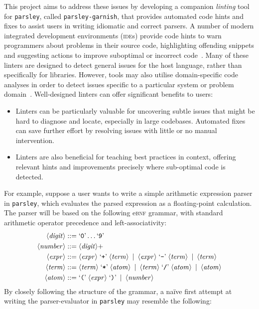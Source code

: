 \documentclass[../../main.tex]{subfiles}
\begin{document}
This project aims to address these issues by developing a companion \emph{linting} tool for \texttt{parsley}, called \texttt{parsley-garnish}, that provides automated code hints and fixes to assist users in writing idiomatic and correct parsers.
A number of modern integrated development environments (\textsc{ide}s) provide code hints to warn programmers about problems in their source code, highlighting offending snippets and suggesting actions to improve suboptimal or incorrect code~\cite{kurbatova_intellij_2021}.
Many of these linters are designed to detect general issues for the host language, rather than specifically for libraries.
However, tools may also utilise domain-specific code analyses in order to detect issues specific to a particular system or problem domain~\cite{renggli_domain-specific_2010,gregor_stllint_2006}.
Well-designed linters can offer significant benefits to users:
\begin{itemize}
  \item Linters can be particularly valuable for uncovering subtle issues that might be hard to diagnose and locate, especially in large codebases. Automated fixes can save further effort by resolving issues with little or no manual intervention.
  \item Linters are also beneficial for teaching best practices in context, offering relevant hints and improvements precisely where sub-optimal code is detected.
\end{itemize}
%
For example, suppose a user wants to write a simple arithmetic expression parser in \texttt{parsley}, which evaluates the parsed expression as a floating-point calculation.
The parser will be based on the following e\textsc{bnf} grammar, with standard arithmetic operator precedence and left-associativity:
\begin{align*}
\langle \mathit{digit} \rangle &::= \text{`\texttt{0}'} \ldots \text{`\texttt{9}'} \\
\langle \mathit{number} \rangle &::= \langle \mathit{digit} \rangle+ \\
\langle \mathit{expr} \rangle &::= \langle \mathit{expr} \rangle \; \text{`\texttt{+}'} \; \langle \mathit{term} \rangle \enspace | \enspace \langle \mathit{expr} \rangle \; \text{`\texttt{-}'} \; \langle \mathit{term} \rangle \enspace | \enspace \langle \mathit{term} \rangle \\
\langle \mathit{term} \rangle &::= \langle \mathit{term} \rangle \; \text{`\texttt{*}'} \; \langle \mathit{atom} \rangle \enspace | \enspace \langle \mathit{term} \rangle \; \text{`\texttt{/}'} \; \langle \mathit{atom} \rangle \enspace | \enspace \langle \mathit{atom} \rangle \\
\langle \mathit{atom} \rangle &::= \text{`\texttt{(}'} \; \langle \mathit{expr} \rangle \; \text{`\texttt{)}'} \enspace | \enspace \langle \mathit{number} \rangle \\
\end{align*}
%
By closely following the structure of the grammar, a naïve first attempt at writing the parser-evaluator in \texttt{parsley} may resemble the following:
\end{document}
